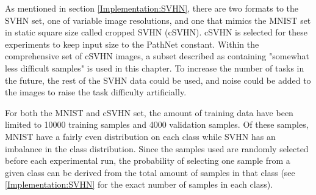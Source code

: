 As mentioned in section \ref{Implementation:SVHN}, there are two formats to the SVHN set, one of variable image resolutions, and one that mimics the MNIST set in static square size called cropped SVHN (cSVHN). cSVHN is selected for these experiments to keep input size to the PathNet constant. Within the comprehensive set of cSVHN images, a subset described as containing "somewhat less difficult samples" is used in this chapter. To increase the number of tasks in the future, the rest of the SVHN data could be used, and noise could be added to the images to raise the task difficulty artificially. 

For both the MNIST and cSVHN set, the amount of training data have been limited to 10000 training samples and 4000 validation samples. Of these samples, MNIST have a fairly even distribution on each class while SVHN has an imbalance in the class distribution. Since the samples used are randomly selected before each experimental run, the probability of selecting one sample from a given class can be derived from the total amount of samples in that class (see \ref{Implementation:SVHN} for the exact number of samples in each class).


